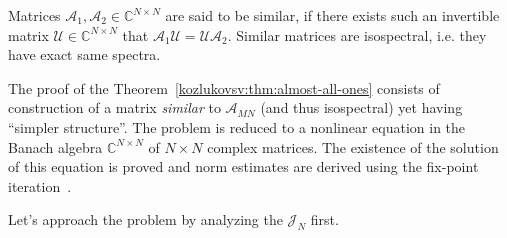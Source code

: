 Matrices \( \mathcal{A}_1, \mathcal{A}_2 \in\mathbb{C}^{N\times N} \)
    are said to be similar, if
    there exists such an invertible matrix \( \mathcal{U}\in\mathbb{C}^{N\times N} \)
    that \( \mathcal{A}_1 \mathcal{U} = \mathcal{U} \mathcal{A}_2 \).
Similar matrices are isospectral, i.e. they have exact same spectra.

The proof of the Theorem~\ref{kozlukovsv:thm:almost-all-ones} consists of construction of a matrix
    \emph{similar} to \( \mathscr{A}_{MN} \) (and thus isospectral)
    yet having ``simpler structure''.
The problem is reduced to a nonlinear equation in the Banach algebra
    \( \mathbb{C}^{N\times N} \) of \( N\times N \) complex matrices.
The existence of the solution of this equation is proved
    and norm estimates are derived using the fix-point iteration~\cite{baskakov-harmonic}.

Let's approach the problem by analyzing the \( \mathcal{J}_N \) first.

